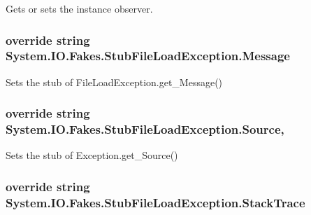 Gets or sets the instance observer.

\hypertarget{class_system_1_1_i_o_1_1_fakes_1_1_stub_file_load_exception_a0aa85398f705e37e88b6c2c0773ca898}{
\subsubsection[{Message}]{\setlength{\rightskip}{0pt plus 5cm}override string System.\-I\-O.\-Fakes.\-Stub\-File\-Load\-Exception.\-Message\hspace{0.3cm}{\ttfamily [get]}}}\label{class_system_1_1_i_o_1_1_fakes_1_1_stub_file_load_exception_a0aa85398f705e37e88b6c2c0773ca898}


Sets the stub of File\-Load\-Exception.\-get\-\_\-\-Message()

\hypertarget{class_system_1_1_i_o_1_1_fakes_1_1_stub_file_load_exception_a27a9053e5bc71b4116177dceee35a7af}{
\subsubsection[{Source}]{\setlength{\rightskip}{0pt plus 5cm}override string System.\-I\-O.\-Fakes.\-Stub\-File\-Load\-Exception.\-Source\hspace{0.3cm}{\ttfamily [get]}, {\ttfamily [set]}}}\label{class_system_1_1_i_o_1_1_fakes_1_1_stub_file_load_exception_a27a9053e5bc71b4116177dceee35a7af}


Sets the stub of Exception.\-get\-\_\-\-Source()

\hypertarget{class_system_1_1_i_o_1_1_fakes_1_1_stub_file_load_exception_a2f1d840c6a67113a7ca7f100c4b1e27a}{
\subsubsection[{Stack\-Trace}]{\setlength{\rightskip}{0pt plus 5cm}override string System.\-I\-O.\-Fakes.\-Stub\-File\-Load\-Exception.\-Stack\-Trace\hspace{0.3cm}{\ttfamily [get]}}}\label{class_system_1_1_i_o_1_1_fakes_1_1_stub_file_load_exception_a2f1d840c6a67113a7ca7f100c4b1e27a}


